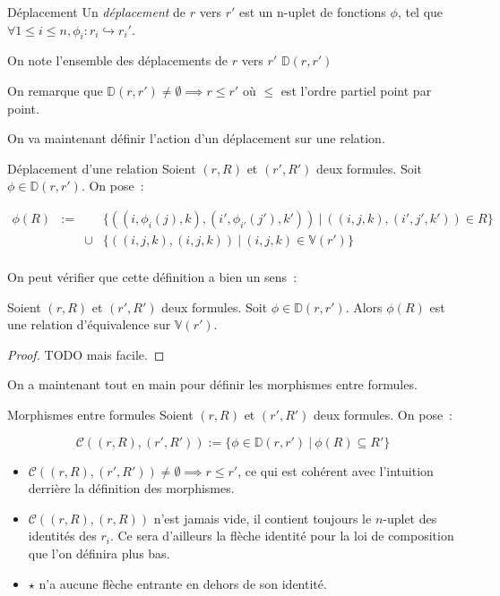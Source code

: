 \documentclass[12pt]{article}
\newcommand\V{\mathbb{V}}
\newcommand\D{\mathbb{D}}
\renewcommand\C{\mathscr{C}}
\begin{document}
\begin{defi}{Déplacement}
    Un \emph{déplacement} de $r$ vers $r'$ est un n-uplet de fonctions $\phi$, tel que
    $\forall 1\leq i\leq n, \phi_i : r_i\hookrightarrow r_i'$.

    On note l'ensemble des déplacements de $r$ vers $r'$ $\D(r,r')$
\end{defi}

\begin{rem}
    On remarque que $\D(r,r')\neq\emptyset\implies r\leq r'$ où $\leq$ est l'ordre
    partiel point par point.
\end{rem}

On va maintenant définir l'action d'un déplacement sur une relation.

\begin{defi}{Déplacement d'une relation}
    Soient $(r,R)$ et $(r',R')$ deux formules. Soit $\phi\in\D(r,r')$. On pose~:

    \[ \begin{array}{rccl}
          \phi(R) &:= & & \{ ((i,\phi_i(j), k), (i', \phi_{i'}(j'), k'))
                           ~|~ ((i,j,k), (i',j',k'))\in R \} \\
                  &   & \cup &\{ ((i,j,k), (i,j,k)) ~|~ (i,j,k)\in\V(r') \} \\
    \end{array} \]
\end{defi}

On peut vérifier que cette définition a bien un sens~:

\begin{lem}
    Soient $(r,R)$ et $(r',R')$ deux formules. Soit $\phi\in\D(r,r')$.
    Alors $\phi(R)$ est une relation d'équivalence sur $\V(r')$.
\end{lem}

\begin{proof}
    TODO mais facile.
\end{proof}

On a maintenant tout en main pour définir les morphismes entre formules.

\begin{defi}{Morphismes entre formules}
    Soient $(r,R)$ et $(r',R')$ deux formules. On pose~:

    \[\C((r,R),(r',R')) := \{ \phi\in\D(r,r') ~|~ \phi(R)\subseteq R' \}\]
\end{defi}

\begin{rem}\begin{itemize}
    \item $\C((r,R), (r',R'))\neq\emptyset \implies r\leq r'$, ce qui est cohérent
        avec l'intuition derrière la définition des morphismes.
    \item $\C((r,R), (r,R))$ n'est jamais vide, il contient toujours le $n$-uplet
        des identités des $r_i$. Ce sera d'ailleurs la flèche identité pour la loi
        de composition que l'on définira plus bas.
    \item $\star$ n'a aucune flèche entrante en dehors de son identité.
\end{itemize}\end{rem}
\end{document}
